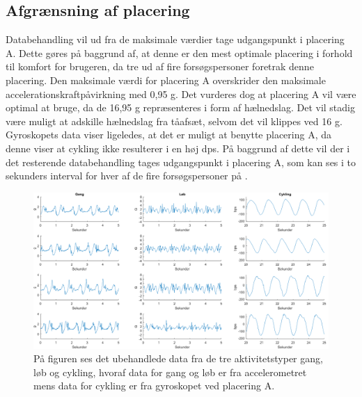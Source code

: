 \subsection{Afgrænsning af placering}
Databehandling vil ud fra de maksimale værdier tage udgangspunkt i placering A. Dette gøres på baggrund af, at denne er den mest optimale placering i forhold til komfort for brugeren, da tre ud af fire forsøgspersoner foretrak denne placering. Den maksimale værdi for placering A overskrider den maksimale accelerationskraftpåvirkning med 0,95 g. Det vurderes dog at placering A vil være optimal at bruge, da de 16,95 g repræsenteres i form af hælnedslag. Det vil stadig være muligt at adskille hælnedslag fra tåafsæt, selvom det vil klippes ved 16 g. \newline
Gyroskopets data viser ligeledes, at det er muligt at benytte placering A, da denne viser at cykling ikke resulterer i en høj dps. På baggrund af dette vil der i det resterende databehandling tages udgangspunkt i placering A, som kan ses i to sekunders interval for hver af de fire forsøgspersoner på .
\begin{figure}[H]
	\centering
	\includegraphics[scale=0.38]{figures/qBilag/raa_data}
	\caption{På figuren ses det ubehandlede data fra de tre aktivitetstyper gang, løb og cykling, hvoraf data for gang og løb er fra accelerometret mens data for cykling er fra gyroskopet ved placering A.}
	\label{raa_data}
\end{figure}

